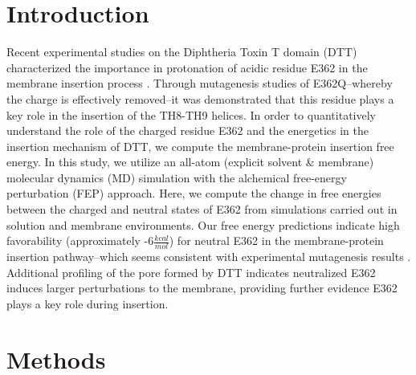 \section{Introduction}
Recent experimental studies on the Diphtheria Toxin T domain (DTT) characterized the importance in protonation of acidic residue E362 in the membrane insertion process \cite{ghatak2015role}.
Through mutagenesis studies of E362Q--whereby the charge is effectively removed--it was demonstrated that this residue plays a key role in the insertion of the TH8-TH9 helices.
In order to quantitatively understand the role of the charged residue E362 and the energetics in the insertion mechanism of DTT, we compute the membrane-protein insertion free energy.
In this study, we utilize an all-atom (explicit solvent \& membrane) molecular dynamics (MD) simulation with the alchemical free-energy perturbation (FEP) approach.
Here, we compute the change in free energies between the charged and neutral states of E362 from simulations carried out in solution and membrane environments.
Our free energy predictions indicate high favorability (approximately -6$\frac{kcal}{mol}$) for neutral E362 in the membrane-protein insertion pathway--which seems consistent with experimental mutagenesis results \cite{ghatak2015role}.
Additional profiling of the pore formed by DTT indicates neutralized E362 induces larger perturbations to the membrane, providing further evidence E362 plays a key role during insertion.

\section{Methods}
